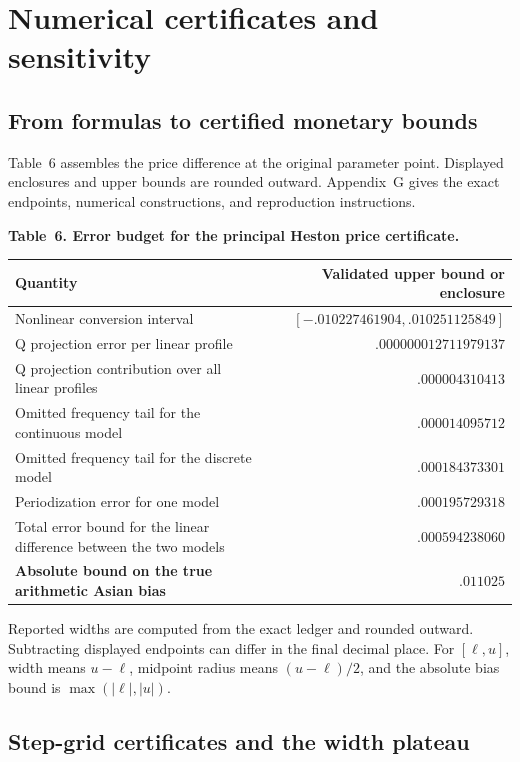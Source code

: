 \documentclass[11pt,a4paper]{article}
\begin{document}
\section{Numerical certificates and sensitivity}

\subsection{From formulas to certified monetary bounds}

Table~6 assembles the price difference at the original parameter point.
Displayed enclosures and upper bounds are rounded outward. Appendix~G gives
the exact endpoints, numerical constructions, and reproduction instructions.

\noindent\textbf{Table~6. Error budget for the principal Heston price certificate.}
\begin{center}
\begin{tabularx}{\textwidth}{@{}X r@{}}
\toprule
Quantity & Validated upper bound or enclosure \\
\midrule
Nonlinear conversion interval & \([-.010227461904,.010251125849]\) \\
Q projection error per linear profile & \(.000000012711979137\) \\
Q projection contribution over all linear profiles & \(.000004310413\) \\
Omitted frequency tail for the continuous model & \(.000014095712\) \\
Omitted frequency tail for the discrete model & \(.000184373301\) \\
Periodization error for one model & \(.000195729318\) \\
Total error bound for the linear difference between the two models & \(.000594238060\) \\
\textbf{Absolute bound on the true arithmetic Asian bias} & \(\boldsymbol{.011025}\) \\
\bottomrule
\end{tabularx}
\end{center}

Reported widths are computed from the exact ledger and rounded outward.
Subtracting displayed endpoints can differ in the final decimal place.
For \([\ell,u]\), width means \(u-\ell\), midpoint radius means
\((u-\ell)/2\), and the absolute bias bound is
\(\max(|\ell|,|u|)\).

\subsection{Step-grid certificates and the width plateau}
\end{document}
